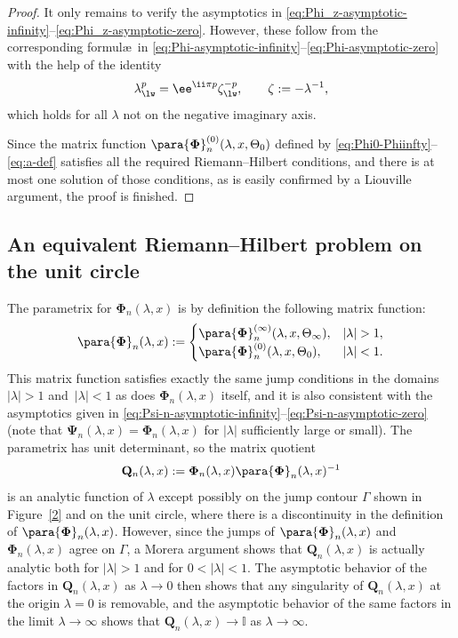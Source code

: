 \begin{proof}
It only remains to verify the asymptotics in \eqref{eq:Phi_z-asymptotic-infinity}--\eqref{eq:Phi_z-asymptotic-zero}. However, these follow from the corresponding formul\ae\ in \eqref{eq:Phi-asymptotic-infinity}--\eqref{eq:Phi-asymptotic-zero} with the help of the identity
\begin{equation*}
 \lambda^p_{\lw}=\ee^{\ii \pi p}\zeta^{-p}_{\lw},\qquad\zeta:=-\lambda^{-1},
\end{equation*}
which holds for all $\lambda$ not on the negative imaginary axis.

Since the matrix function $\para{\mathbf{\Phi}}_n^{(0)}(\lambda,x, \Theta_0)$ defined by \eqref{eq:Phi0-Phiinfty}--\eqref{eq:a-def} satisfies all the required Riemann--Hilbert conditions, and there is at most one solution of those conditions, as is easily confirmed by a Liouville argument, the proof is finished.
\end{proof}

\subsection{An equivalent Riemann--Hilbert problem on the unit circle}
The parametrix for $\mathbf{\Phi}_n(\lambda,x)$ is by definition the following matrix function:
\begin{equation*} %
 \para{\mathbf{\Phi}}_n(\lambda,x):=\begin{cases}
 \para{\mathbf{\Phi}}^{(\infty)}_n(\lambda,x, \Theta_\infty),& |\lambda|>1,\\
 \para{\mathbf{\Phi}}_n^{(0)}(\lambda,x, \Theta_0),& |\lambda|<1.
 \end{cases}
\end{equation*}
This matrix function satisfies exactly the same jump conditions in the domains $|\lambda|>1$ and~${|\lambda|<1}$ as does $\mathbf{\Phi}_n(\lambda,x)$ itself, and it is also consistent with the asymptotics given in \eqref{eq:Psi-n-asymptotic-infinity}--\eqref{eq:Psi-n-asymptotic-zero} (note that $\mathbf{\Psi}_n(\lambda,x)=\mathbf{\Phi}_n(\lambda,x)$ for $|\lambda|$ sufficiently large or small). The parametrix has unit determinant, so the matrix quotient
\begin{equation*}
 \mathbf{Q}_n(\lambda,x):=\mathbf{\Phi}_n(\lambda,x)\para{\mathbf{\Phi}}_n(\lambda,x)^{-1}
\end{equation*}
is an analytic function of $\lambda$ except possibly on the jump contour $\Gamma$ shown in Figure~\ref{2} and on the unit circle, where there is a discontinuity in the definition of $\para{\mathbf{\Phi}}_n(\lambda,x)$. However, since the jumps of $\para{\mathbf{\Phi}}_n(\lambda,x)$ and $\mathbf{\Phi}_n(\lambda,x)$ agree on $\Gamma$, a Morera argument shows that $\mathbf{Q}_n(\lambda,x)$ is actually analytic both for $|\lambda|>1$ and for $0<|\lambda|<1$. The asymptotic behavior of the factors in $\mathbf{Q}_n(\lambda,x)$ as $\lambda\to 0$ then shows that any singularity of $\mathbf{Q}_n(\lambda,x)$ at the origin $\lambda=0$ is removable, and the asymptotic behavior of the same factors in the limit $\lambda\to\infty$ shows that $\mathbf{Q}_n(\lambda,x)\to\mathbb{I}$ as $\lambda\to\infty$.

